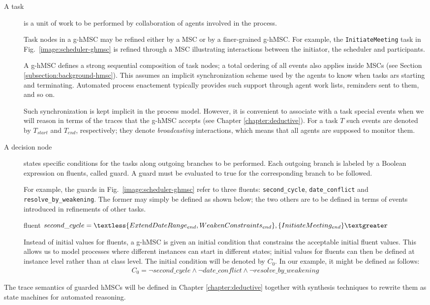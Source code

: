 \begin{description}

\item[A task] is a unit of work to be performed by collaboration of agents involved in the process. 

Task nodes in a g-hMSC may be refined either by a MSC or by a finer-grained g-hMSC. For example, the \texttt{InitiateMeeting} task in Fig.~\ref{image:scheduler-ghmsc} is refined through a MSC illustrating interactions between the initiator, the scheduler and participants. 

A g-hMSC defines a strong sequential composition of task nodes; a total ordering of all events also applies inside MSCs (see Section \ref{subsection:background-hmsc}). This assumes an implicit synchronization scheme used by the agents to know when tasks ars starting and terminating. Automated process enactement typically provides such support through agent work lists, reminders sent to them, and so on. 

Such synchronization is kept implicit in the process model. However, it is convenient to associate with a task special events when we will reason in terms of the traces that the g-hMSC accepts (see Chapter \ref{chapter:deductive}). For a task $T$ such events are denoted by $T_{start}$ and $T_{end}$, respectively; they denote \emph{broadcasting} interactions, which means that all agents are supposed to monitor them. 

\item[A decision node] states specific conditions for the tasks along outgoing branches to be performed. Each outgoing branch is labeled by a Boolean expression on fluents, called guard. A guard must be evaluated to true for the corresponding branch to be followed.

For example, the guards in Fig.~\ref{image:scheduler-ghmsc} refer to three fluents: \texttt{second\_cycle}, \texttt{date\_conflict} and \texttt{resolve\_by\_weakening}. The former may simply be defined as shown below; the two others are to be defined in terms of events introduced in refinements of other tasks.
\begin{center}
fluent $second\_cycle = \textless \{ ExtendDateRange_{end}, \newline WeakenConstraints_{end} \},
 \{ InitiateMeeting_{end} \} \textgreater $\\
\end{center}

Instead of initial values for fluents, a g-hMSC is given an initial condition that constrains the acceptable initial fluent values. This allows us to model processes where different instances can start in different states; initial values for fluents can then be defined at instance level rather than at class level. The initial condition will be denoted by $C_0$. In our example, it might be defined as follows:
\begin{align*}
C_0 = \neg second\_cycle \wedge \neg date\_conflict \wedge \neg resolve\_by\_weakening
\end{align*}

\end{description} 

The trace semantics of guarded hMSCs will be defined in Chapter \ref{chapter:deductive} together with synthesis techniques to rewrite them as state machines for automated reasoning.
